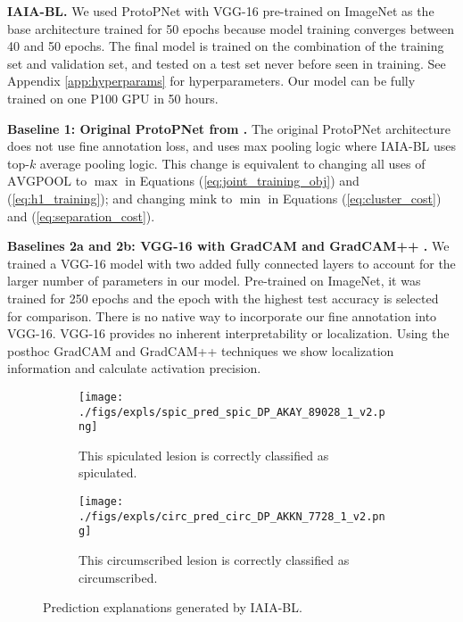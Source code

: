 \documentclass[11pt]{article}
\begin{document}
    \textbf{IAIA-BL.} We used ProtoPNet with VGG-16 pre-trained on ImageNet as the base architecture trained for 50 epochs because model training converges between 40 and 50 epochs. The final model is trained on the combination of the training set and validation set, and tested on a test set never before seen in training. See Appendix \ref{app:hyperparams} for hyperparameters. Our model can be fully trained on one P100 GPU in 50 hours.

    \textbf{Baseline 1: Original ProtoPNet from \citep{PPNet}.} The original ProtoPNet architecture does not use fine annotation loss, and uses max pooling logic where IAIA-BL uses top-$k$ average pooling logic. This change is equivalent to changing all uses of $\textrm{AVGPOOL}$ to $\max$ in Equations (\ref{eq:joint_training_obj}) and (\ref{eq:h1_training}); and changing $\mathrm{mink}$ to $\min$ in Equations (\ref{eq:cluster_cost}) and (\ref{eq:separation_cost}). 

    \textbf{Baselines 2a and 2b: VGG-16 \citep{simonyan2015very} with GradCAM \cite{Selvaraju_2017_ICCV} and GradCAM++ \cite{chattopadhay2018grad}.} We trained a VGG-16 model with two added fully connected layers to account for the larger number of parameters in our model. Pre-trained on ImageNet, it was trained for 250 epochs and the epoch with the highest test accuracy is selected for comparison. There is no native way to incorporate our fine annotation into VGG-16. VGG-16 provides no inherent interpretability or localization. Using the posthoc GradCAM and GradCAM++ techniques we show localization information and calculate activation precision.

\begin{figure}
    \centering
        \begin{subfigure}{\textwidth}
        \texttt{[image: ./figs/expls/spic\_pred\_spic\_DP\_AKAY\_89028\_1\_v2.png]}
        \caption{This spiculated lesion is correctly classified as spiculated.}
        \end{subfigure}
        
        \begin{subfigure}{\textwidth}
        \texttt{[image: ./figs/expls/circ\_pred\_circ\_DP\_AKKN\_7728\_1\_v2.png]}
        \caption{This circumscribed lesion is correctly classified as circumscribed.}
        \end{subfigure}
        
    \caption{Prediction explanations generated by IAIA-BL.}
    \label{fig:IAIA_expls}
\end{figure}
\end{document}

